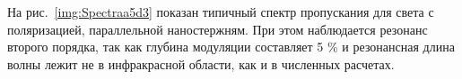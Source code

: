 На рис.~\ref{img:Spectraa5d3} показан типичный спектр пропускания для света с поляризацией, параллельной наностержням. При этом наблюдается резонанс второго порядка, так как глубина модуляции составляет 5 \% и резонансная длина волны лежит не в инфракрасной области, как и в численных расчетах.

